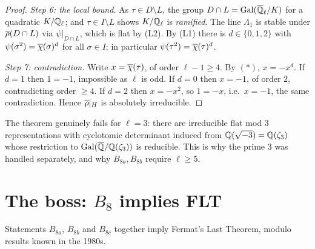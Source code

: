 \documentclass[11pt]{article}
\begin{document}
\begin{proof}
\emph{Step 6: the local bound.} As $\tau\in D\setminus L$, the group
$D\cap L=\operatorname{Gal}(\overline{\mathbb{Q}}_\ell/K)$ for a quadratic $K/\mathbb{Q}_\ell$; and $\tau\in I\setminus L$
shows $K/\mathbb{Q}_\ell$ is \emph{ramified}. The line $\Lambda_1$ is stable under
$\overline{\rho}(D\cap L)$ via $\psi|_{D\cap L}$, which is flat by (L2). By (L1) there is
$d\in\{0,1,2\}$ with $\psi(\sigma^2)=\overline{\chi}(\sigma)^d$ for all $\sigma\in I$; in
particular $\psi(\tau^2)=\overline{\chi}(\tau)^d$.

\emph{Step 7: contradiction.} Write $x=\overline{\chi}(\tau)$, of order $\ell-1\geq4$.
By $(*)$, $x=-x^{d}$. If $d=1$ then $1=-1$, impossible as $\ell$ is odd. If
$d=0$ then $x=-1$, of order $2$, contradicting order $\geq4$. If $d=2$ then
$x=-x^2$, so $1=-x$, i.e.\ $x=-1$, the same contradiction. Hence $\overline{\rho}|_H$ is
absolutely irreducible.
\end{proof}

\begin{remark}
The theorem genuinely fails for $\ell=3$: there are irreducible flat mod $3$
representations with cyclotomic determinant induced from $\mathbb{Q}(\sqrt{-3})=\mathbb{Q}(\zeta_3)$
whose restriction to $\operatorname{Gal}(\overline{\mathbb{Q}}/\mathbb{Q}(\zeta_3))$ is reducible. This is why the
prime $3$ was handled separately, and why $B_{8a},B_{8b}$ require $\ell\geq5$.
\end{remark}

\section{The boss: $B_8$ implies FLT}

\begin{theorem}\label{thm:boss8}
Statements $B_{8a}$, $B_{8b}$ and $B_{8c}$ together imply Fermat's Last
Theorem, modulo results known in the 1980s.
\end{theorem}
\end{document}
